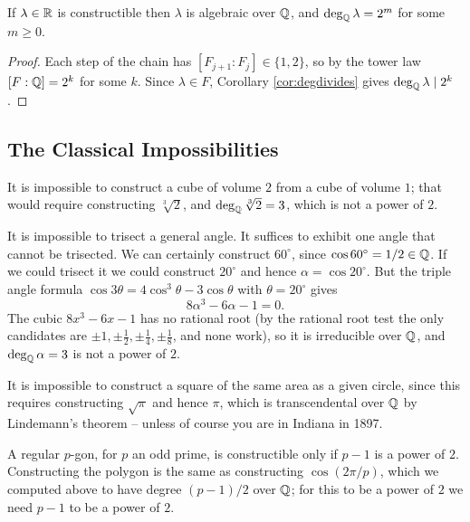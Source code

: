 \documentclass[a4paper]{scrartcl}
\begin{document}
\begin{corollary}\label{cor:construct}
	If $\lambda \in \mathbb{R}$ is constructible then $\lambda$ is algebraic over $\mathbb{Q}$, and $\deg_{\mathbb{Q}} \lambda = 2^m$ for some $m \geq 0$.
\end{corollary}

\begin{proof}
	Each step of the chain has $[F_{j+1}:F_j] \in \{1,2\}$, so by the tower law $[F:\mathbb{Q}] = 2^k$ for some $k$. Since $\lambda \in F$, Corollary \ref{cor:degdivides} gives $\deg_{\mathbb{Q}} \lambda \mid 2^k$.
\end{proof}

\subsection{The Classical Impossibilities}

\begin{example}
	It is impossible to construct a cube of volume $2$ from a cube of volume $1$; that would require constructing $\sqrt[3]{2}$, and $\deg_{\mathbb{Q}} \sqrt[3]{2} = 3$, which is not a power of $2$.
\end{example}

\begin{example}
	It is impossible to trisect a general angle. It suffices to exhibit one angle that cannot be trisected. We can certainly construct $60^\circ$, since $\cos 60^\circ = 1/2 \in \mathbb{Q}$. If we could trisect it we could construct $20^\circ$ and hence $\alpha = \cos 20^\circ$. But the triple angle formula $\cos 3\theta = 4\cos^3\theta - 3\cos\theta$ with $\theta = 20^\circ$ gives
	$$8\alpha^3 - 6\alpha - 1 = 0.$$
	The cubic $8x^3 - 6x - 1$ has no rational root (by the rational root test the only candidates are $\pm 1, \pm\frac12, \pm\frac14, \pm\frac18$, and none work), so it is irreducible over $\mathbb{Q}$, and $\deg_{\mathbb{Q}} \alpha = 3$ is not a power of $2$.
\end{example}

\begin{example}
	It is impossible to construct a square of the same area as a given circle, since this requires constructing $\sqrt \pi$ and hence $\pi$, which is transcendental over $\mathbb{Q}$ by Lindemann's theorem -- unless of course you are in Indiana in 1897.
\end{example}

\begin{example}
	A regular $p$-gon, for $p$ an odd prime, is constructible only if $p - 1$ is a power of $2$. Constructing the polygon is the same as constructing $\cos(2\pi/p)$, which we computed above to have degree $(p-1)/2$ over $\mathbb{Q}$; for this to be a power of $2$ we need $p-1$ to be a power of $2$.
\end{example}
\end{document}
